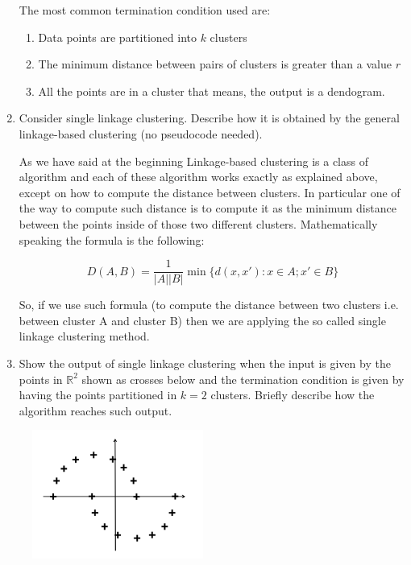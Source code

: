 \documentclass[a4paper,11pt,oneside]{book}
\begin{document}
\begin{enumerate}
\begin{solution}
        The most common termination condition used are:
        \begin{enumerate}
        \item Data points are partitioned into $k$ clusters
        \item The minimum distance between pairs of clusters is greater than a value $r$
        \item All the points are in a cluster that means, the output is a dendogram.
        \end{enumerate}
    \end{solution}
\item Consider single linkage clustering. Describe how it is obtained by the general linkage-based clustering (no pseudocode needed).
    \begin{solution}
        As we have said at the beginning Linkage-based clustering is a class of algorithm and each of these algorithm works exactly as explained above, except on how to compute the distance between clusters. In particular one of the way to compute such distance is to compute it as the minimum distance between the points inside of those two different clusters. Mathematically speaking the formula is the following:
        
        $$D(A,B) = \frac{1}{|A||B|} \min\{d(x,x') : x \in A; x' \in B\}$$
        
        So, if we use such formula (to compute the distance between two clusters i.e. between cluster A and cluster B) then we are applying the so called single linkage clustering method.
    \end{solution}
\item Show the output of single linkage clustering when the input is given by the points in $\mathbb{R}^2$ shown as crosses below and the termination condition is given by having the points partitioned in $k = 2$ clusters. Briefly describe how the algorithm reaches such output.
\end{enumerate}

\begin{figure}[H]
    \centering
    \includegraphics[width=0.5\textwidth,height=0.5\textheight,keepaspectratio]{images/4_28_Jan_2021.png}
 \end{figure}
\end{document}

